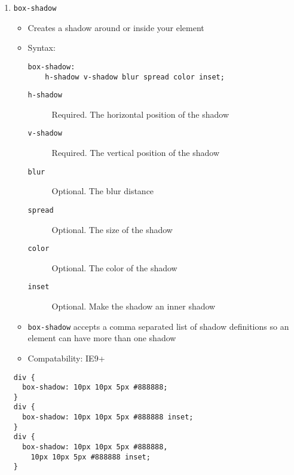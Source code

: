 \documentclass[10pt, twocolumn]{article}
\begin{document}
\begin{enumerate}
\item \texttt{box-shadow}
\begin{itemize}
\item Creates a shadow around or inside your element
\item Syntax:
\begin{lstlisting}[frame=single]
box-shadow: 
    h-shadow v-shadow blur spread color inset;
\end{lstlisting}
\begin{description}
\item[\texttt{h-shadow}] Required.  The horizontal position of the shadow
\item[\texttt{v-shadow}] Required.  The vertical position of the shadow
\item[\texttt{blur}] Optional.  The blur distance
\item[\texttt{spread}] Optional.  The size of the shadow
\item[\texttt{color}] Optional.  The color of the shadow
\item[\texttt{inset}] Optional.  Make the shadow an inner shadow
\end{description}
\item \texttt{box-shadow} accepts a comma separated list of shadow definitions so an element can have more than one shadow
\item Compatability: IE9+
\end{itemize}
\begin{lstlisting}[frame=single]
div {
  box-shadow: 10px 10px 5px #888888;
}
div {
  box-shadow: 10px 10px 5px #888888 inset;
}
div {
  box-shadow: 10px 10px 5px #888888, 
    10px 10px 5px #888888 inset;
}
\end{lstlisting}


\end{enumerate}
\end{document}
